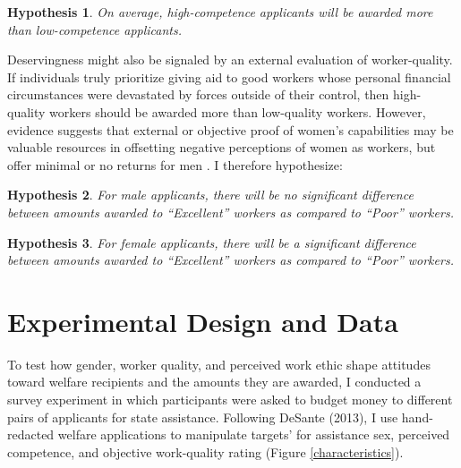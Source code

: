 \documentclass[12pt]{article}%
\newtheorem{hypothesis}{Hypothesis}
\begin{document}
\begin{doublespace}
\begin{hypothesis} \label{hyp:second}
On average, high-competence applicants will be awarded more than low-competence applicants.
\end{hypothesis}


Deservingness might also be signaled by an external evaluation of worker-quality. If individuals truly prioritize giving aid to good workers whose personal financial circumstances were devastated by forces outside of their control, then high-quality workers should be awarded more than low-quality workers. However, evidence suggests that external or objective proof of women’s capabilities may be valuable resources in offsetting negative perceptions of women as workers, but offer minimal or no returns for men \citep{abel_value_2020, dadgar_labor_2015, jepsen_labor-market_2014}. I therefore hypothesize:


\begin{hypothesis} \label{hyp:thirda}
	For male applicants, there will be no significant difference between amounts awarded to ``Excellent” workers as compared to ``Poor” workers.
\end{hypothesis}

\begin{hypothesis} \label{hyp:thirdb}
	For female applicants, there will be a significant difference between amounts awarded to ``Excellent” workers as compared to ``Poor” workers.
\end{hypothesis}


\section*{Experimental Design and Data}
To test how gender, worker quality, and perceived work ethic shape attitudes toward welfare recipients and the amounts they are awarded, I conducted a survey experiment in which participants were asked to budget money to different pairs of applicants for state assistance. Following DeSante (2013), I use hand-redacted welfare applications to manipulate targets’ for assistance sex, perceived competence, and objective work-quality rating (Figure \ref{characteristics}).


\end{doublespace}
\end{document}

